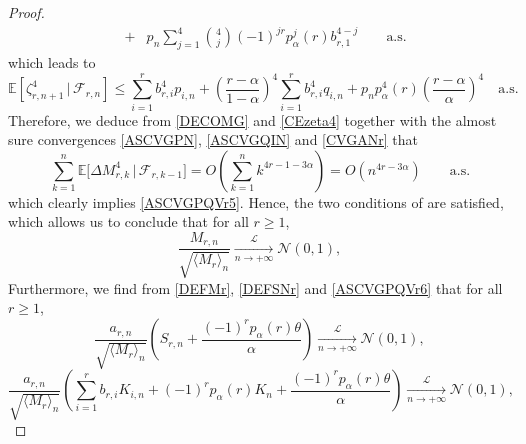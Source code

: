 \documentclass[twoside,12pt]{article}
\newcommand{\cL}{\mathcal{L}}
\newcommand{\E}{\mathds{E}}
\newcommand{\cN}{\mathcal{N}}
\begin{document}
\begin{proof}
\begin{eqnarray*}
&+& p_{n}\sum_{j=1}^{4}\binom{4}{j}(-1)^{jr}p_{\alpha}^{j}(r)b_{r,1}^{4-j} 
\qquad \text{a.s.} 
\end{eqnarray*}
which leads to
\begin{equation}
\label{CEzeta4}
\E[\zeta_{r,n+1}^4\,|\,\mathcal{F}_{r,n}] \leq \sum_{i=1}^{r}b_{r,i}^4 p_{i,n} + \left(\frac{r-\alpha}{1-\alpha}\right)^{\!\!4} \sum_{i=1}^{r}b_{r,i}^4 q_{i,n}
+ p_n p_{\alpha}^4(r) \left(\frac{r-\alpha}{\alpha}\right)^{\!\!4}  
\quad \text{a.s.} 
\end{equation}
Therefore, we deduce from \eqref{DECOMG} and \eqref{CEzeta4} together with
the almost sure convergences \eqref{ASCVGPN}, \eqref{ASCVGQIN} and \eqref{CVGANr} that
\begin{equation}
\label{CEMG4}
\sum_{k=1}^{n}\E\big[\Delta M_{r, k}^4 \,|\,\mathcal{F}_{r,k-1}\big]=O\left( \sum_{k=1}^n k^{4r-1-3\alpha} \right)=O(n^{4r-3\alpha}) \qquad\text{a.s.}
\end{equation}
which clearly implies \eqref{ASCVGPQVr5}.
Hence, the two conditions of \citep[Corollary 3.1]{Hal(80)}
are satisfied, which allows us to conclude that for all $r \geq 1$,
\begin{equation}
\label{ASCVGPQVr6}
\frac{M_{r,n}}{\sqrt{\langle M_{r} \rangle_n}} \underset{n\rightarrow+\infty}{\overset{\cL}{\longrightarrow}} \cN(0, 1),
\end{equation}
Furthermore, we find from \eqref{DEFMr}, \eqref{DEFSNr} and \eqref{ASCVGPQVr6} that for all $r \geq 1$,
\begin{equation*}
\frac{a_{r,n}}{\sqrt{\langle M_{r} \rangle_n}} \left(S_{r,n}+\frac{(-1)^{r} p_{\alpha}(r) \theta}{\alpha}\right)\underset{n\rightarrow+\infty}{\overset{\cL}{\longrightarrow}} \cN(0, 1),
\end{equation*}
\begin{equation*}
\frac{a_{r,n}}{\sqrt{\langle M_{r} \rangle_n}} \left( \sum_{i=1}^{r}b_{r,i}K_{i,n} +(-1)^r p_{\alpha}(r) K_{n}  +\frac{(-1)^{r} p_{\alpha}(r) \theta}{\alpha}\right)\underset{n\rightarrow+\infty}{\overset{\cL}{\longrightarrow}} \cN(0, 1),
\end{equation*}

\end{proof}
\end{document}
